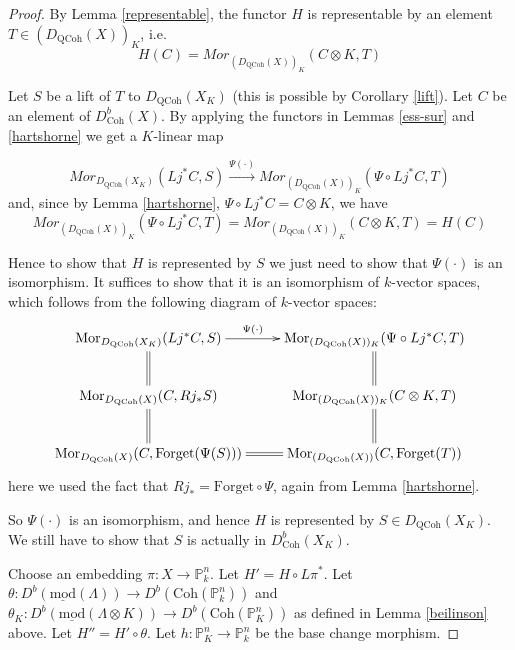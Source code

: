 \documentclass{amsart}
\begin{document}
\begin{proof}
By Lemma \ref{representable}, the functor $H$ is representable by an element $T\in (D_{\mathrm{QCoh}}(X))_{K}$, i.e.
$$H(C)=Mor_{(D_{\mathrm{QCoh}}(X))_{K}}(C\otimes K,T)$$

Let $S$ be a lift of $T$ to $D_{\mathrm{QCoh}}(X_{K})$ (this is possible by Corollary \ref{lift}). Let $C$ be an element of $D^{b}_{\mathrm{Coh}}(X)$. By applying the functors in Lemmas \ref{ess-sur} and \ref{hartshorne} we get a $K$-linear map 

$$Mor_{D_{\mathrm{QCoh}}(X_{K})}(Lj^{*}C,S) \xrightarrow{\Psi(\cdot)} Mor_{(D_{\mathrm{QCoh}}(X))_{K}}(\Psi\circ Lj^{*}C,T)$$
and, since by Lemma \ref{hartshorne}, $\Psi\circ Lj^{*}C=C\otimes K$, we have
$$Mor_{(D_{\mathrm{QCoh}}(X))_{K}}(\Psi\circ Lj^{*}C,T)=Mor_{(D_{\mathrm{QCoh}}(X))_{K}}(C\otimes K,T)=H(C)$$

Hence to show that $H$ is represented by $S$ we just need to show that $\Psi(\cdot)$ is an isomorphism. It suffices to show that it is an isomorphism of $k$-vector spaces, which follows from the following diagram of $k$-vector spaces:
$$\xymatrix{
\mathrm{Mor}_{D_{\mathrm{QCoh}}(X_{K})}(Lj^{*}C,S)  \ar[r]^-{\Psi(\cdot)} \ar@{=}[d]
& \mathrm{Mor}_{(D_{\mathrm{QCoh}}(X))_{K}}(\Psi\circ Lj^{*}C,T) \ar@{=}[d] \\
\mathrm{Mor}_{D_{\mathrm{QCoh}}(X)}(C,Rj_{*}S)   \ar@{=}[d]
& \mathrm{Mor}_{(D_{\mathrm{QCoh}}(X))_{K}}(C\otimes K,T) \ar@{=}[d] \\
\mathrm{Mor}_{D_{\mathrm{QCoh}}(X)}(C,\text{Forget}(\Psi(S))) \ar@{=}[r] 
& \mathrm{Mor}_{(D_{\mathrm{QCoh}}(X))}(C,\text{Forget}(T)) 
}$$
here we used the fact that $Rj_{*}=\text{Forget}\circ \Psi$, again from Lemma \ref{hartshorne}.

So $\Psi(\cdot)$ is an isomorphism, and hence $H$ is represented by $S\in D_{\mathrm{QCoh}}(X_{K})$. We still have to show that $S$ is actually in $D^{b}_{\mathrm{Coh}}(X_{K})$.

Choose an embedding $\pi:X{\rightarrow}{\mathbb{P}}^{n}_{k}$. Let $H'=H\circ L\pi^{*}$. Let $\theta:D^{b}(\underline{\mathrm{mod}}(\Lambda)){\rightarrow} D^{b}(\text{Coh}({\mathbb{P}}^{n}_{k}))$ and $\theta_{K}:D^{b}(\underline{\mathrm{mod}}(\Lambda\otimes K)){\rightarrow} D^{b}(\text{Coh}({\mathbb{P}}^{n}_{K}))$ as defined in Lemma \ref{beilinson} above. Let $H''=H'\circ\theta$. Let $h:{\mathbb{P}}^{n}_{K}{\rightarrow} {\mathbb{P}}^{n}_{k}$ be the base change morphism.


\end{proof}
\end{document}
